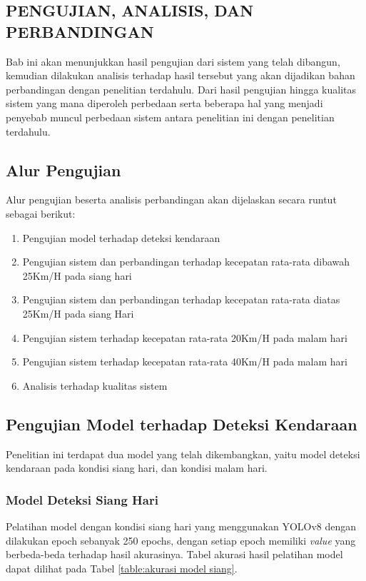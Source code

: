 \begin{spacing}{1.2}
	\chapter{PENGUJIAN, ANALISIS, DAN PERBANDINGAN}
	\label{sec:chap4_analisis}
\end{spacing}

\vspace{4ex}

Bab ini akan menunjukkan hasil pengujian dari sistem yang telah dibangun, kemudian dilakukan analisis terhadap hasil tersebut yang akan dijadikan bahan perbandingan dengan penelitian terdahulu. Dari hasil pengujian hingga kualitas sistem yang mana diperoleh perbedaan serta beberapa hal yang menjadi penyebab muncul perbedaan sistem antara penelitian ini dengan penelitian terdahulu.

\section{Alur Pengujian}
Alur pengujian beserta analisis perbandingan akan dijelaskan secara runtut sebagai berikut:

\begin{enumerate}[nolistsep]
    \item Pengujian model terhadap deteksi kendaraan
    \item Pengujian sistem dan perbandingan terhadap kecepatan rata-rata dibawah 25Km/H pada siang hari
    \item Pengujian sistem dan perbandingan terhadap kecepatan rata-rata diatas 25Km/H pada siang Hari
    \item Pengujian sistem terhadap kecepatan rata-rata 20Km/H pada malam hari
    \item Pengujian sistem terhadap kecepatan rata-rata 40Km/H pada malam hari
    \item Analisis terhadap kualitas sistem
\end{enumerate}

\section{Pengujian Model terhadap Deteksi Kendaraan}
Penelitian ini terdapat dua model yang telah dikembangkan, yaitu model deteksi kendaraan pada kondisi siang hari, dan kondisi malam hari.

\subsection{Model Deteksi Siang Hari}
Pelatihan model dengan kondisi siang hari yang menggunakan YOLOv8 dengan dilakukan epoch sebanyak 250 epochs, dengan setiap epoch memiliki \emph{value} yang berbeda-beda terhadap hasil akurasinya. Tabel akurasi hasil pelatihan model dapat dilihat pada Tabel \ref{table:akurasi model siang}.

